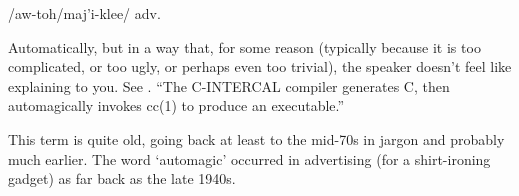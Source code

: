  /aw-toh/maj'i-klee/ adv.

Automatically, but in a way that, for some reason (typically because it is too complicated, or too ugly, or perhaps even too trivial), the
speaker doesn't feel like explaining to you. See . ``The C-INTERCAL compiler generates C, then automagically invokes cc(1)
to produce an executable.''

This term is quite old, going back at least to the mid-70s in jargon and probably much earlier. The word `automagic' occurred in advertising
(for a shirt-ironing gadget) as far back as the late 1940s.

